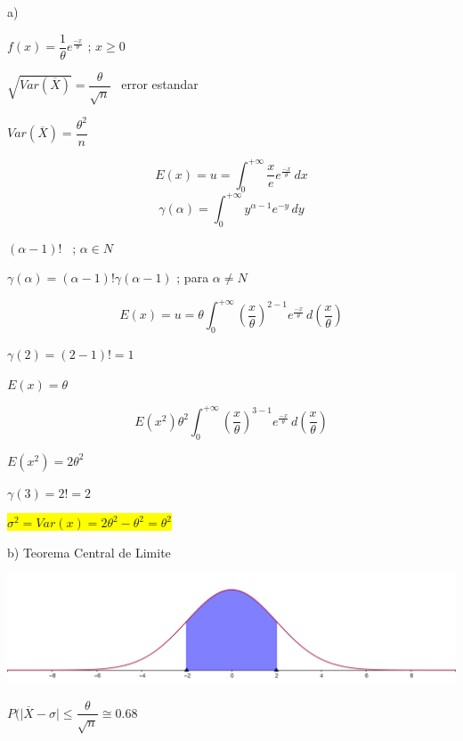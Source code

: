 \documentclass[DIV=calc,paper=a4,fontsize=11pt,openany]{book}
\begin{document}
a) 
\begin{center}
$f(x) = \dfrac{1}{\theta}e^{\frac{-x}{\theta}}$ ; $x\geqslant 0$
\end{center}
\begin{center}
$\sqrt{Var(\overline{X})} = \dfrac{\theta}{\sqrt{n}}$ \  error estandar
\end{center}
\begin{center}
$Var(\overline{X}) = \dfrac{\theta^{2}}{n}$
\end{center}
\[ E(x) = u = \int_{0}^{+\infty} \! \dfrac{x}{e}e^\frac{-x}{\theta} \, dx 
\]
\[\gamma(\alpha)=\int_{0}^{+\infty} \! y^{\alpha-1}e^{-y} \, dy\]
\begin{center}
$(\alpha-1)!$ \ ; $ \alpha \in N $
\end{center}
\begin{center}
$\gamma(\alpha) = (\alpha-1)!\gamma(\alpha-1)$ ; para $\alpha \neq N$
\end{center}
\[ E(x) = u = \theta\int_{0}^{+\infty} \! (\dfrac{x}{\theta})^{2-1}e^\frac{-x}{\theta} \, d(\frac{x}{\theta})
\]
\begin{center}
$\gamma(2)=(2-1)! = 1$
\end{center}
\begin{center}
$ E(x)= \theta $
\end{center}
\[ E(x^{2})  \theta^{2}\int_{0}^{+\infty} \! (\dfrac{x}{\theta})^{3-1}e^\frac{-x}{\theta} \, d(\frac{x}{\theta})
\]
\begin{center}
$E(x^{2})=2\theta^{2}$
\end{center}
\begin{center}
$\gamma(3)= 2!= 2$
\end{center}
\begin{center}
\colorbox{yellow}{$\sigma^{2} = Var(x) = 2\theta^{2}-\theta^{2} = \theta^{2}$}
\end{center}
\newpage
b) Teorema Central de Limite\\
\begin{center}
\includegraphics[scale=0.15]{Imagenes/geogebra-export.png} 
\end{center}
\begin{center}
$P(\mid\overline{X}- \sigma \mid \leq \dfrac{\theta}{\sqrt{n}} \cong 0.68$
\end{center}
\end{document}
